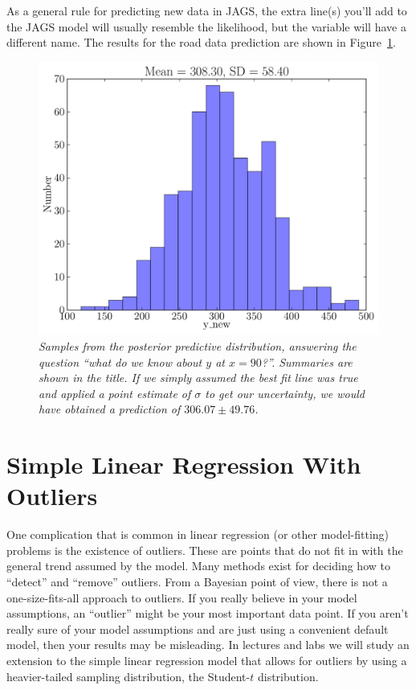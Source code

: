 As a general rule for predicting new data in JAGS, the extra line(s) you'll add to the JAGS
model will usually resemble the likelihood, but the variable will have a different name.
The results for the road data prediction are shown
in Figure~\ref{fig:road_prediction}.
\begin{figure}[ht!]
\begin{center}
\includegraphics[scale=0.5]{Figures/road_prediction.pdf}
\caption{\it Samples from the posterior predictive distribution, answering the
question ``what do we know about $y$ at $x=90$?''. Summaries are shown in
the title. If we simply assumed the best fit line was true and applied a
point estimate of $\sigma$ to get our uncertainty, we would have obtained a
prediction of $306.07 \pm 49.76$.\label{fig:road_prediction}}
\end{center}
\end{figure}

\section{Simple Linear Regression With Outliers}
One complication that is common in linear regression (or other model-fitting)
problems is the existence of outliers. These are points that do not fit in with
the general trend assumed by the model. Many methods exist for deciding how to
``detect'' and ``remove''
outliers. From a Bayesian point of view, there is not a one-size-fits-all approach
to outliers. If you really believe in your model assumptions, an ``outlier''
might be your most important data point. If you aren't really sure of your
model assumptions and are just using a convenient default model, then your results
may be misleading.
In lectures and labs we will study an extension to the simple linear
regression model that allows for outliers by using a heavier-tailed sampling
distribution, the Student-$t$ distribution.

